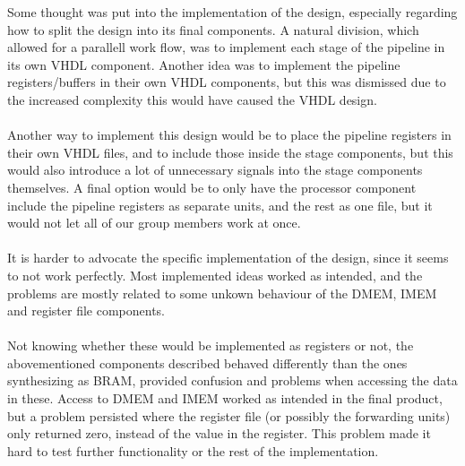 Some thought was put into the implementation of the design, especially regarding
how to split the design into its final components. A natural division, which
allowed for a parallell work flow, was to implement each stage of the pipeline
in its own VHDL component. Another idea was to implement the pipeline
registers/buffers in their own VHDL components, but this was dismissed due to
the increased complexity this would have caused the VHDL design.
\paragraph*{}
Another way to implement this design would be to place the pipeline registers in
their own VHDL files, and to include those inside the stage components, but this
would also introduce a lot of unnecessary signals into the stage components
themselves. A final option would be to only have the processor component include
the pipeline registers as separate units, and the rest as one file, but it would not
let all of our group members work at once.
\paragraph*{}
It is harder to advocate the specific implementation of the design, since it
seems to not work perfectly. Most implemented ideas worked as intended, and
the problems are mostly related to some unkown behaviour of the DMEM, IMEM and
register file components.
\paragraph*{}
Not knowing whether these would be implemented as registers or not, the
abovementioned components described behaved differently than the ones
synthesizing as BRAM, provided confusion and problems when accessing the data
in these. Access to DMEM and IMEM worked as intended in the final product, but a
problem persisted where the register file (or possibly the forwarding units)
only returned zero, instead of the value in the register. This problem made it
hard to test further functionality or the rest of the implementation.